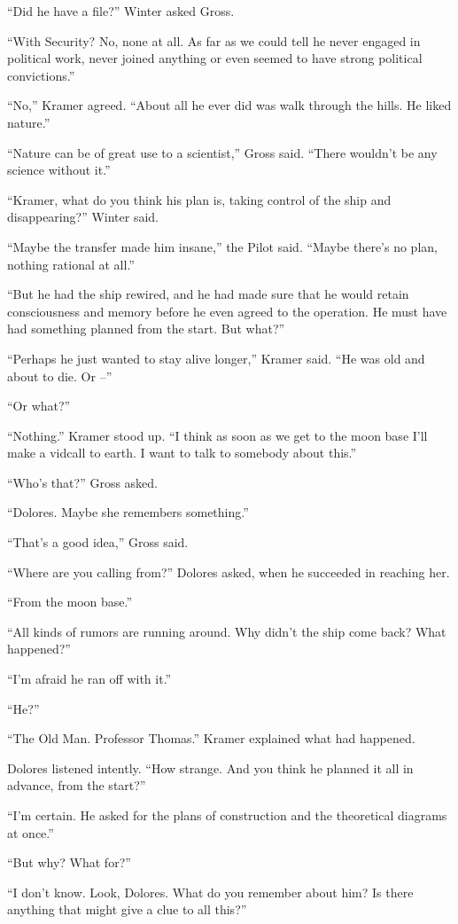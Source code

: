 \documentclass[12pt,a5paper]{book}
\newcommand{\storybreak}{%
  \par\vspace{0.6\baselineskip}
  \begin{center}\color{coveraccent}\small *\enspace *\enspace *\end{center}
  \vspace{0.3\baselineskip}\noindent\ignorespaces
}
\begin{document}
“Did he have a file?” Winter asked Gross.

“With Security? No, none at all. As far as we could tell he never engaged in political work, never joined anything or even seemed to have strong political convictions.”

“No,” Kramer agreed. “About all he ever did was walk through the hills. He liked nature.”

“Nature can be of great use to a scientist,” Gross said. “There wouldn't be any science without it.”

“Kramer, what do you think his plan is, taking control of the ship and disappearing?” Winter said.

“Maybe the transfer made him insane,” the Pilot said. “Maybe there's no plan, nothing rational at all.”

“But he had the ship rewired, and he had made sure that he would retain consciousness and memory before he even agreed to the operation. He must have had something planned from the start. But what?”

“Perhaps he just wanted to stay alive longer,” Kramer said. “He was old and about to die. Or –”

“Or what?”

“Nothing.” Kramer stood up. “I think as soon as we get to the moon base I'll make a vidcall to earth. I want to talk to somebody about this.”

“Who's that?” Gross asked.

“Dolores. Maybe she remembers something.”

“That's a good idea,” Gross said.

\storybreak
“Where are you calling from?” Dolores asked, when he succeeded in reaching her.

“From the moon base.”

“All kinds of rumors are running around. Why didn't the ship come back? What happened?”

“I'm afraid he ran off with it.”

“He?”

“The Old Man. Professor Thomas.” Kramer explained what had happened.

Dolores listened intently. “How strange. And you think he planned it all in advance, from the start?”

“I'm certain. He asked for the plans of construction and the theoretical diagrams at once.”

“But why? What for?”

“I don't know. Look, Dolores. What do you remember about him? Is there anything that might give a clue to all this?”
\end{document}
